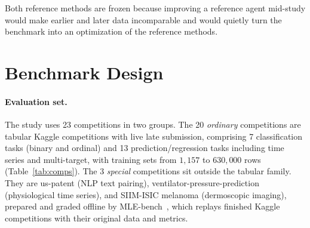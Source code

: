 \documentclass[11pt,a4paper]{article}
\begin{document}
Both reference methods are frozen because improving a reference agent mid-study would make earlier and later data incomparable and would quietly turn the benchmark into an optimization of the reference methods.

\section{Benchmark Design}
\label{sec:fairness}

\paragraph{Evaluation set.} The study uses 23 competitions in two groups. The 20 \emph{ordinary} competitions are tabular Kaggle competitions with live late submission, comprising 7 classification tasks (binary and ordinal) and 13 prediction/regression tasks including time series and multi-target, with training sets from $1{,}157$ to $630{,}000$ rows (Table~\ref{tab:comps}). The 3 \emph{special} competitions sit outside the tabular family. They are us-patent (NLP text pairing), ventilator-pressure-prediction (physiological time series), and SIIM-ISIC melanoma (dermoscopic imaging), prepared and graded offline by MLE-bench~\cite{mlebench}, which replays finished Kaggle competitions with their original data and metrics.
\end{document}
